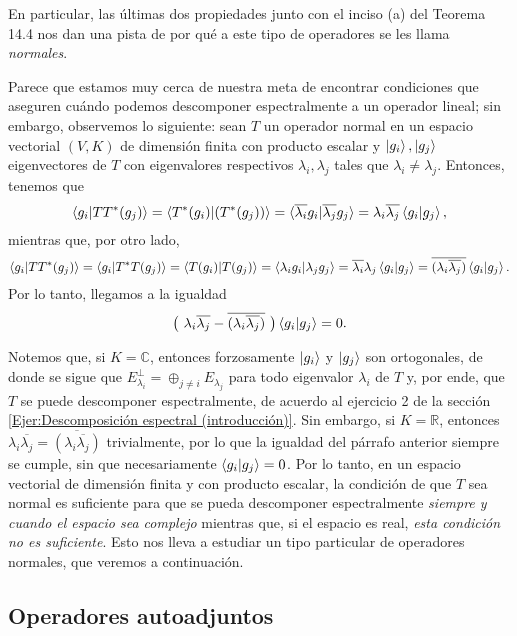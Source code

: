 \documentclass[12pt,libertine]{book}
\begin{document}
En particular, las últimas dos propiedades junto con el inciso (a) del Teorema 14.4 nos dan una pista de por qué a este tipo de operadores se les llama \emph{normales}.

\vspace{3mm}
Parece que estamos muy cerca de nuestra meta de encontrar condiciones que aseguren cuándo podemos descomponer espectralmente a un operador lineal; sin embargo, observemos lo siguiente: sean $T$ un operador normal en un espacio vectorial $(V,K)$ de dimensión finita con producto escalar y $\ket{g_i},\ket{g_j}$ eigenvectores de $T$ con eigenvalores respectivos $\lambda_i, \lambda_j$ tales que $\lambda_i\neq \lambda_j$. Entonces, tenemos que 
$$\braket{g_i|TT^*(g_j)}=\braket{T^*(g_i)|(T^*(g_j))}=\braket{\overline{\lambda_i}g_i|\overline{\lambda_j}g_j}=\lambda_i \overline{\lambda_j}\braket{g_i|g_j},$$ 
mientras que, por otro lado, 
$$\braket{g_i|TT^*(g_j)}=\braket{g_i|T^*T(g_j)}=\braket{T(g_i)|T(g_j)}=\braket{\lambda_i g_i|\lambda_jg_j}=\overline{\lambda_i}\lambda_j\braket{g_i|g_j}=\overline{(\lambda_i \overline{\lambda_j})}\braket{g_i|g_j}.$$
Por lo tanto, llegamos a la igualdad
$$\big( \ \lambda_i \overline{\lambda_j} - \overline{(\lambda_i \overline{\lambda_j})} \ \big)\braket{g_i|g_j}=0.$$

Notemos que, si $K=\mathbb{C}$, entonces forzosamente $\ket{g_i}$ y $\ket{g_j}$ son ortogonales, de donde se sigue que $E_{\lambda_i}^\perp=\oplus_{j\neq i}E_{\lambda_j}$ para todo eigenvalor $\lambda_i$ de $T$ \textemdash y, por ende, que $T$ se puede descomponer espectralmente, de acuerdo al ejercicio 2 de la sección \ref{Ejer:Descomposición espectral (introducción)}. Sin embargo, si $K=\mathbb{R}$, entonces $\lambda_i \overline{\lambda_j} = \overline{(\lambda_i \overline{\lambda_j})}$ trivialmente, por lo que la igualdad del párrafo anterior siempre se cumple, sin que necesariamente $\braket{g_i|g_j}=0$. Por lo tanto, en un espacio vectorial de dimensión finita y con producto escalar, la condición de que $T$ sea normal es suficiente para que se pueda descomponer espectralmente \emph{siempre y cuando el espacio sea complejo} mientras que, si el espacio es real, \emph{esta condición no es suficiente}. Esto nos lleva a estudiar un tipo particular de operadores normales, que veremos a continuación.

\subsection*{Operadores autoadjuntos} \label{Subsec:Operadores autoadjuntos}
\end{document}

